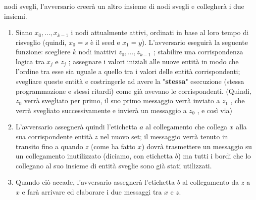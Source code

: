 \begin{enumerate}
\begin{enumerate}
                    nodi svegli, l'avversario creerà un altro insieme di nodi
                    svegli e collegherà i due insiemi.
                    \begin{enumerate}
                        \item Siano $x_0 , . . . , x_{k-1}$ i nodi attualmente
                              attivi, ordinati in base al loro tempo di
                              risveglio (quindi, $x_0 = s$ è il seed e $x_1 =
                                  y$). L'avversario eseguirà la seguente funzione:
                              scegliere $k$ nodi inattivi $z_0 , . . . ,
                                  z_{k-1}$ ; stabilire una corrispondenza logica tra
                              $x_j$ e $z_j$ ; assegnare i valori iniziali alle
                              nuove entità in modo che l'ordine tra esse sia
                              uguale a quello tra i valori delle entità
                              corrispondenti; svegliare queste entità e
                              costringerle ad avere la "\textbf{stessa}"
                              esecuzione (stessa programmazione e stessi
                              ritardi) come già avevano le corrispondenti.
                              (Quindi, $z_0$ verrà svegliato per primo, il suo
                              primo messaggio verrà inviato a $z_1$ , che verrà
                              svegliato successivamente e invierà un messaggio a
                              $z_0$ , e così via)
                        \item L'avversario assegnerà quindi l'etichetta $a$ al
                              collegamento che collega $x$ alla sua
                              corrispondente entità $z$ nel nuovo set; il
                              messaggio verrà tenuto in transito fino a quando
                              $z$ (come ha fatto $x$) dovrà trasmettere un
                              messaggio su un collegamento inutilizzato
                              (diciamo, con etichetta $b$) ma tutti i bordi che
                              lo collegano al suo insieme di entità sveglie sono
                              già stati utilizzati.
                        \item Quando ciò accade, l'avversario assegnerà
                              l'etichetta $b$ al collegamento da $z$ a $x$ e
                              farà arrivare ed elaborare i due messaggi tra $x$
                              e $z$.
                    \end{enumerate}

\end{enumerate}
\end{enumerate}
